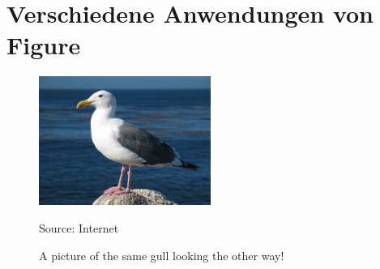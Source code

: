 \documentclass[10pt]{article}
\begin{document}
\section{Verschiedene Anwendungen von Figure}


\begin{figure}[h]
\centering
\end{figure}

\begin{figure}[h]
  \centering
      \includegraphics[width=0.5\textwidth]{pics/gull_picture}\par %
      Source: Internet
  \caption{A picture of the same gull
           looking the other way!}
\end{figure}
\newpage
\end{document}
